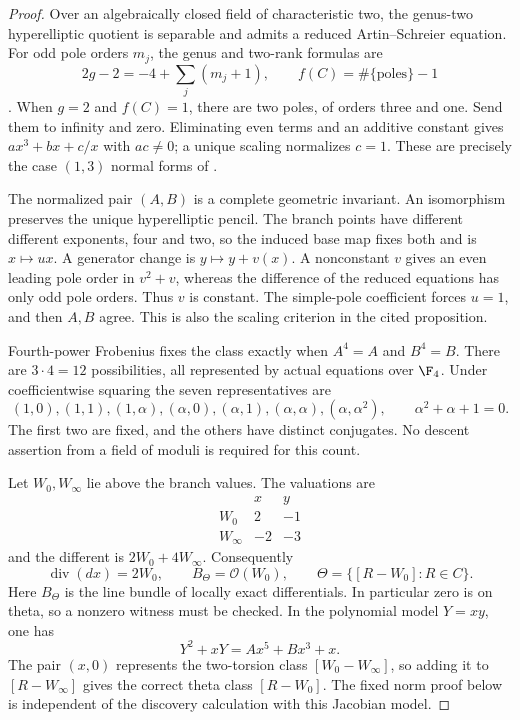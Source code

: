 \begin{proof}
Over an algebraically closed field of
characteristic two, the genus-two
hyperelliptic quotient is separable and
admits a reduced Artin--Schreier equation.
For odd pole orders $m_j$, the genus and
two-rank formulas are
\[
 2g-2=-4+\sum_j(m_j+1),\qquad
 f(C)=\#\{\text{poles}\}-1
\]
\citep[Notation 1.1, author p.~2]{A_ElkinPries2013}.
When $g=2$ and $f(C)=1$, there are two
poles, of orders three and one. Send
them to infinity and zero. Eliminating
even terms and an additive constant gives
$ax^3+bx+c/x$ with $ac\ne0$; a unique
scaling normalizes $c=1$.
These are precisely the case $(1,3)$
normal forms of
\citet[Proposition 14, author p.~14]
{A_CardonaNartPujolas2005}.

The normalized pair $(A,B)$ is a complete
geometric invariant. An isomorphism
preserves the unique hyperelliptic pencil.
The branch points have different different
exponents, four and two, so the induced
base map fixes both and is $x\mapsto ux$.
A generator change is $y\mapsto y+v(x)$.
A nonconstant $v$ gives an even leading
pole order in $v^2+v$, whereas the difference
of the reduced equations has only odd
pole orders. Thus $v$ is constant.
The simple-pole coefficient forces $u=1$,
and then $A,B$ agree. This is also the
scaling criterion in the cited proposition.

Fourth-power Frobenius fixes the class
exactly when $A^4=A$ and $B^4=B$.
There are $3\cdot4=12$ possibilities,
all represented by actual equations
over $\F_4$. Under coefficientwise
squaring the seven representatives are
\[
 (1,0),(1,1),(1,\alpha),(\alpha,0),
 (\alpha,1),(\alpha,\alpha),(\alpha,\alpha^2),
 \qquad \alpha^2+\alpha+1=0.                               \tag{C2.93}
\]
The first two are fixed, and the others
have distinct conjugates. No descent
assertion from a field of moduli is
required for this count.

Let $W_0,W_\infty$ lie above the branch
values. The valuations are
\[
 \begin{array}{c|rr}
       &x&y\\\hline
 W_0&2&-1\\
 W_\infty&-2&-3
 \end{array}
\]
and the different is $2W_0+4W_\infty$.
Consequently
\[
 \operatorname{div}(dx)=2W_0,
 \qquad B_\Theta=\mathcal O(W_0),
 \qquad \Theta=\{[R-W_0]:R\in C\}.                         \tag{C2.94}
\]
Here $B_\Theta$ is the line bundle of
locally exact differentials. In particular
zero is on theta, so a nonzero witness
must be checked. In the polynomial model
$Y=xy$, one has
\[
                 Y^2+xY=Ax^5+Bx^3+x.
\]
The pair $(x,0)$ represents the two-torsion
class $[W_0-W_\infty]$, so adding it to
$[R-W_\infty]$ gives the correct theta
class $[R-W_0]$. The fixed norm proof
below is independent of the discovery
calculation with this Jacobian model.


\end{proof}
